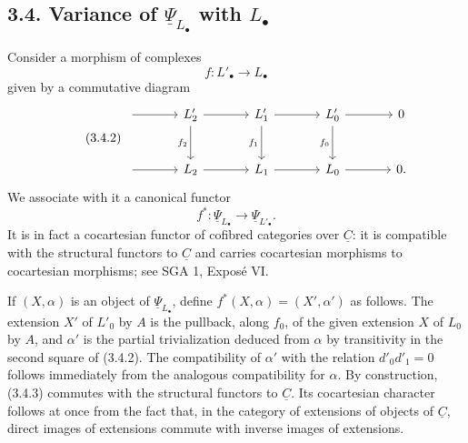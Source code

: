 
\subsection*{3.4. Variance of $\underline\Psi_{L_\bullet}$ with
$L_\bullet$}

Consider a morphism of complexes
\begin{equation}\tag{3.4.1}
 f:L'_\bullet\longrightarrow L_\bullet
\end{equation}
given by a commutative diagram
\begin{equation}\tag{3.4.2}
\begin{tikzcd}[column sep=large,row sep=large]
 {}\arrow[r]&L'_2\arrow[r]\arrow[d,"f_2"']
 &L'_1\arrow[r]\arrow[d,"f_1"']
 &L'_0\arrow[r]\arrow[d,"f_0"']&0\\
 {}\arrow[r]&L_2\arrow[r]&L_1\arrow[r]&L_0\arrow[r]&0.
\end{tikzcd}
\end{equation}
We associate with it a canonical functor
\begin{equation}\tag{3.4.3}
 f^*:\underline\Psi_{L_\bullet}\longrightarrow
 \underline\Psi_{L'_\bullet}.
\end{equation}
It is in fact a cocartesian functor of cofibred categories over
$\underline C$: it is compatible with the structural functors to
$\underline C$ and carries cocartesian morphisms to cocartesian
morphisms; see SGA 1, Exposé VI.

If $(X,\alpha)$ is an object of $\underline\Psi_{L_\bullet}$, define
$f^*(X,\alpha)=(X',\alpha')$ as follows. The extension $X'$ of
$L'_0$ by $A$ is the pullback, along $f_0$, of the given extension
$X$ of $L_0$ by $A$, and $\alpha'$ is the partial trivialization
deduced from $\alpha$ by transitivity in the second square of
(3.4.2). The compatibility of $\alpha'$ with the relation
$d'_0d'_1=0$ follows immediately from the analogous compatibility
for $\alpha$. By construction, (3.4.3) commutes with the structural
functors to $\underline C$. Its cocartesian character follows at
once from the fact that, in the category of extensions of objects of
$\underline C$, direct images of extensions commute with inverse
images of extensions.

